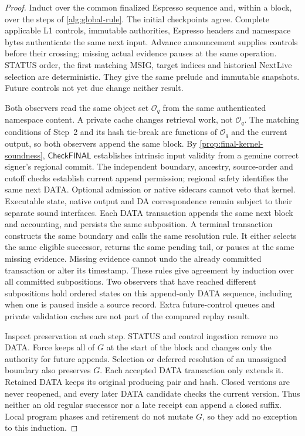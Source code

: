 \documentclass[11pt,a4paper]{article}
\newcommand{\tagg}[1]{\ensuremath{\mathsf{#1}}}
\begin{document}
\begin{proof}
Induct over the common finalized Espresso sequence and, within a block,
over the steps of \cref{alg:global-rule}.
The initial checkpoints agree. Complete applicable L1 controls,
immutable authorities, Espresso headers and namespace bytes authenticate
the same next input. Advance announcement supplies controls before their
crossing; missing actual evidence pauses at the same operation. STATUS order, the first matching MSIG, target indices and historical
NextLive selection are deterministic. They give the same prelude and
immutable snapshots. Future controls not yet due change neither result.

Both observers read the same object set $\mathcal O_q$ from the same
authenticated namespace content. A private cache changes retrieval work,
not $\mathcal O_q$. The matching conditions of Step~2 and its hash tie-break are
functions of $\mathcal O_q$ and the current output, so both observers
append the same block. By \cref{prop:final-kernel-soundness},
\tagg{CheckFINAL} establishes intrinsic input validity from a genuine
correct signer's regional commit. The independent boundary, ancestry,
source-order and cutoff checks establish current append permission;
regional safety identifies the same next DATA. Optional admission or
native sidecars cannot veto that kernel. Executable state, native output
and DA correspondence remain subject to their separate sound interfaces. Each DATA transaction appends the
same next block and accounting, and persists the same subposition.
A terminal transaction constructs the same boundary and calls the same
resolution rule. It either selects the same eligible successor, returns
the same pending tail, or pauses at the same missing evidence. Missing evidence
cannot undo the already committed transaction or alter its timestamp.
These rules give agreement by induction over all committed subpositions.
Two observers that have reached different subpositions hold ordered
states on this append-only DATA sequence, including when one is paused
inside a source record. Extra future-control queues and private validation
caches are not part of the compared replay result.

Inspect preservation at each step. STATUS and control ingestion remove no DATA. Force keeps all of $G$ at the start of the block and changes only
the authority for future appends. Selection or deferred resolution of an unassigned boundary
also preserves $G$. Each accepted DATA transaction only extends it. Retained DATA keeps its
original producing pair and hash. Closed versions are never reopened,
and every later DATA candidate checks the current version. Thus
neither an old regular successor nor a late receipt can append a closed
suffix. Local program phases and retirement do not mutate $G$, so they
add no exception to this induction.
\end{proof}
\end{document}
